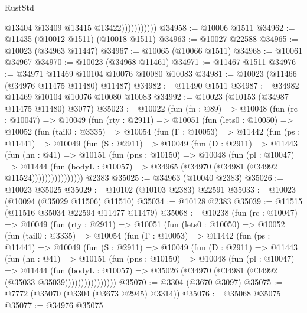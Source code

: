 \begin{lexlean}{RustStd}
\begin{coremodule}
                          @13404
                          @13409
                          @13415
                          @13422)))))))))))
@34958 := @10006 @1511
@34962 := @11435 (@10012 @1511) (@10018 @1511)
@34963 := @10027 @22588
@34965 := @10023 (@34963 @11447)
@34967 := @10065 (@10066 @1511)
@34968 := @10061 @34967
@34970 := @10023 (@34968 @11461)
@34971 := @11467 @1511
@34976 := @34971 @11469 @10104 @10076 @10080 @10083
@34981 := @10023 (@11466 (@34976 @11475 @11480) @11487)
@34982 := @11490 @1511
@34987 := @34982 @11469 @10104 @10076 @10080 @10083
@34992 := @10023 (@10153 (@34987 @11475 @11480) @3077)
@35023 := @10022
    (fun (fn : @89) =>
    @10048
      (fun (rc : @10047) =>
      @10049
        (fun (rty : @2911) =>
        @10051
          (fun (lets0 : @10050) =>
          @10052
            (fun (tail0 : @3335) =>
            @10054
              (fun (Γ : @10053) =>
              @11442
                (fun (ps : @11441) =>
                @10049
                  (fun (S : @2911) =>
                  @10049
                    (fun (D : @2911) =>
                    @11443
                      (fun (hn : @41) =>
                      @10151
                        (fun (pns : @10150) =>
                        @10048
                          (fun (pl : @10047) =>
                          @11444
                            (fun (bodyL : @10057) =>
                            @34965 (@34970 (@34981 (@34992 @11524))))))))))))))))
    @2383
@35025 := @34963 (@10040 @2383)
@35026 := @10023 @35025
@35029 := @10102 (@10103 @2383) @22591
@35033 := @10023 (@10094 (@35029 @11506) @11510)
@35034 := @10128 @2383
@35039 := @11515 (@11516 @35034 @22594 @11477 @11479)
@35068 := @10238
    (fun (rc : @10047) =>
    @10049
      (fun (rty : @2911) =>
      @10051
        (fun (lets0 : @10050) =>
        @10052
          (fun (tail0 : @3335) =>
          @10054
            (fun (Γ : @10053) =>
            @11442
              (fun (ps : @11441) =>
              @10049
                (fun (S : @2911) =>
                @10049
                  (fun (D : @2911) =>
                  @11443
                    (fun (hn : @41) =>
                    @10151
                      (fun (pns : @10150) =>
                      @10048
                        (fun (pl : @10047) =>
                        @11444
                          (fun (bodyL : @10057) =>
                          @35026 (@34970 (@34981 (@34992 (@35033 @35039))))))))))))))))
@35070 := @3304 (@3670 @3097)
@35075 := @7772 (@35070 (@3304 (@3673 @2945) @3314))
@35076 := @35068 @35075
@35077 := @34976 @35075

\end{coremodule}
\end{lexlean}
